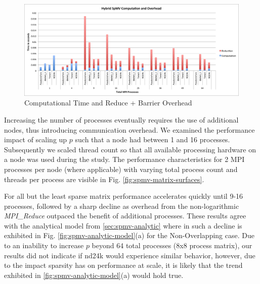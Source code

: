 \begin{figure}\begin{centering}
		\includegraphics[scale=0.35]{figures/stackedbar_overhead.png}
		\caption{Computational Time and Reduce + Barrier Overhead}
		\label{fig:spmv-comp-and-reduction}
\end{centering}\end{figure}

Increasing the number of processes eventually requires the use of additional nodes, thus introducing communication overhead.
We examined the performance impact of scaling up $p$ such that a node had between 1 and 16 processes. Subsequently we scaled thread count so that all available processing hardware on a node was used during the study. The performance characteristics for 2 MPI processes per node (where applicable) with varying total process count and threads per process are visible in Fig. \ref{fig:spmv-matrix-surfaces}. 

For all but the least sparse matrix performance accelerates quickly until 9-16 processes, followed by a sharp decline as overhead from the non-logarithmic \emph{MPI\_Reduce} outpaced the benefit of additional processes. These results agree with the analytical model from \ref{sec:spmv-analytic} where in such a decline is exhibited in Fig. \ref{fig:spmv-analytic-model}(a) for the Non-Overlapping case. Due to an inability to increase $p$ beyond 64 total processes ($8$x$8$ process matrix), our results did not indicate if nd24k would experience similar behavior, however, due to the impact sparsity has on performance at scale, it is likely that the trend exhibited in \ref{fig:spmv-analytic-model}(a) would hold true. 
